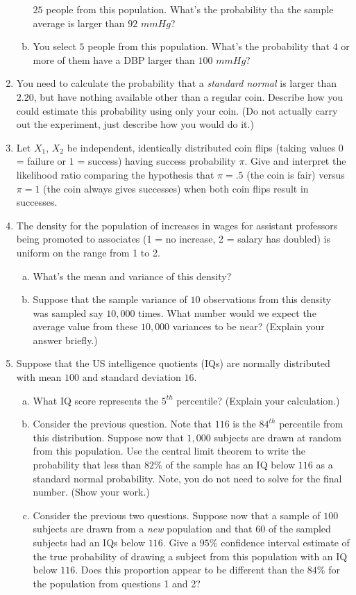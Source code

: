 \documentclass[12pt]{article}
\begin{document}
\begin{enumerate}[Problem 1.]
\begin{enumerate}[a.]
    $25$ people from this population. What's the probability tha the
    sample average is larger than $92$ $mmHg$?
  \item  You select $5$
    people from this population. What's the probability that $4$ or
    more of them have a DBP larger than $100$ $mmHg$?
  \end{enumerate}
\item You need to calculate the probability that a {\em standard normal} is
  larger than $2.20$, but have nothing available other than a regular coin.
  Describe how you could estimate this probability using only your coin. (Do not
  actually carry out the experiment, just describe how you would do it.)
\item Let $X_1$, $X_2$ be independent, identically distributed coin
  flips (taking values $0$ = failure or $1$ = success) having success
  probability $\pi$. Give and interpret the likelihood ratio comparing
  the hypothesis that $\pi = .5$ (the coin is fair) versus $\pi = 1$ (the
  coin always gives successes) when both coin flips result in
  successes.
\item The density for the population of increases in wages for
assistant professors being promoted to associates (1 = no increase, 2 = salary has
doubled) is uniform on the range from 1 to 2.
\begin{enumerate}[a.]
\item What's the mean and variance of this density?
\item Suppose that the sample variance of $10$ observations from this
  density was sampled say $10,000$ times. What number would we expect
  the average value from these $10,000$ variances to be near? (Explain
  your answer briefly.)
\end{enumerate}
\item Suppose that the US intelligence quotients (IQs) are normally
  distributed with mean $100$ and standard deviation $16$.
  \begin{enumerate}[a.]
  \item  What IQ
    score represents the $5^{th}$ percentile? (Explain your calculation.)
  \item Consider the previous question. Note that $116$ is the
    $84^{th}$ percentile from this distribution. Suppose now that
    $1,000$ subjects are drawn at random from this population. Use the
    central limit theorem to write the probability that less than
    $82\%$ of the sample has an IQ below $116$ as a standard normal
    probability. Note, you do not need to solve for the final number. (Show your work.)
  \item Consider the previous two questions. Suppose now that a sample
    of $100$ subjects are drawn from a {\em new} population and that
    $60$ of the sampled subjects had an IQs below $116$. Give a $95\%$
    confidence interval estimate of the true probability of drawing a
    subject from this population with an IQ below $116$. Does this proportion
    appear to be different than the $84\%$ for the population from questions 1 and 2?
  \end{enumerate}


\end{enumerate}
\end{document}
